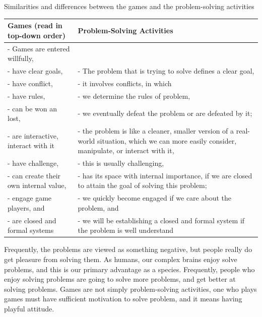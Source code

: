 \begin{quadro}[htb]
\caption{Similarities and differences between the games and the problem-solving activities}
\label{qua:game-and-problem-solving}
\centering
\small
\begin{tabular}{m{5.5cm}|m{9.5cm}}
\textbf{Games} (read in top-down order) & \textbf{Problem-Solving Activities} \\ \hline \hline
- Games are entered willfully, &  \\
- have clear goals,  & - The problem that is trying to solve defines a clear goal, \\
- have conflict, & - it involves conflicts, in which \\
- have rules, & - we determine the rules of problem, \\
- can be won an lost, & - we eventually defeat the problem or are defeated by it; \\
- are interactive, interact with it & - the problem is like a cleaner, smaller version of a real-world situation, which we can more easily consider, manipulate, or interact with it, \\
- have challenge, & - this is usually challenging, \\
- can create their own internal value, & - has its space with internal importance, if we are closed to attain the goal of solving this problem; \\
- engage game players, and & - we quickly become engaged if we care about the problem, and \\
- are closed and formal systems & - we will be establishing a closed and formal system if the problem is well understand \\
\end{tabular}
\end{quadro}

Frequently, the problems are viewed as something negative, but people really do get pleasure from solving them. As humans, our complex brains enjoy solve problems, and this is our primary advantage as a species. Frequently, people who enjoy solving problems are going to solve more problems, and get better at solving problems. Games are not simply problem-solving activities, one who plays games must have sufficient motivation to solve problem, and it means having playful attitude.

